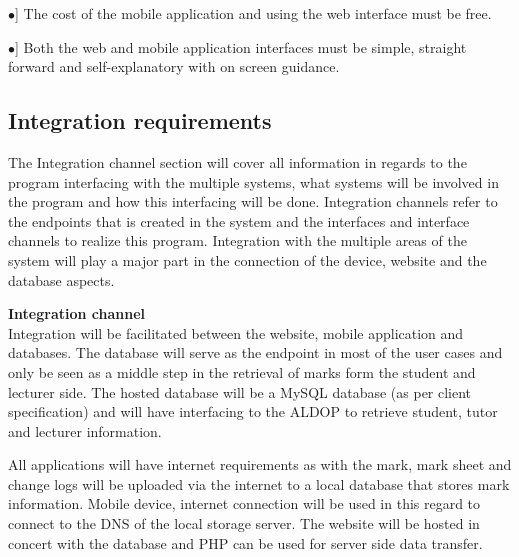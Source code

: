 \documentclass[12pt, a4paper]{scrartcl}
\newcommand{\tab}[1]{\hspace{.05\textwidth}\rlap{#1}}
\begin{document}
				\begin{description}
					\item \tab \textsc{\bf Cost}
					\begin{description}
						\item \tab [$\bullet$] The cost of the mobile application and using the web interface must be free.
					\end{description}
				\end{description}
				\begin{description}
					\item \tab \textsc{\bf Usability}
					\begin{description}
						\item \tab [$\bullet$] Both the web and mobile application interfaces must be simple, straight forward and self-explanatory with on screen guidance.
					\end{description}
				\end{description}
			\subsection{Integration requirements}
			The Integration channel section will cover all information in regards to the program interfacing with the multiple systems, what systems will be involved in the program and how this interfacing will be done. Integration channels refer to the endpoints that is created in the system and the interfaces and interface channels to realize this program. Integration with the multiple areas of the system will play a major part in the connection of the device, website and the database aspects.

			\textbf{Integration channel}\\
			Integration will be facilitated between the website, mobile application and databases. The database will serve as the endpoint in most of the user cases and only be seen as a middle step in the retrieval of marks form the student and lecturer side. The hosted database will be a MySQL database (as per client specification) and will have interfacing to the ALDOP to retrieve student, tutor and lecturer information. 

			All applications will have internet requirements as with the mark, mark sheet and change logs will be uploaded via the internet to a local database that stores mark information. Mobile device, internet connection will be used in this regard to connect to the DNS of the local storage server. The website will be hosted in concert with the database and PHP can be used for server side data transfer.
\end{document}
